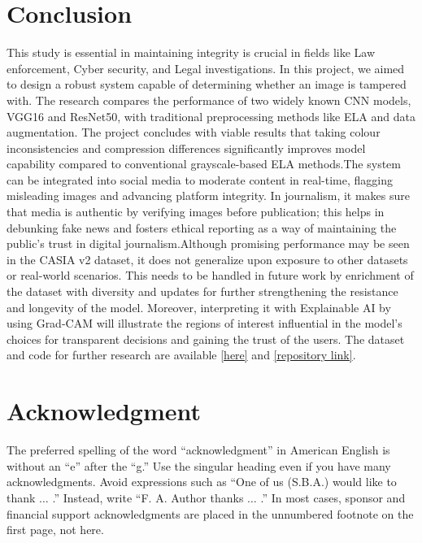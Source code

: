 \documentclass{ieeeaccess}
\begin{document}
\section{Conclusion}
This study is essential in maintaining integrity is crucial in fields like Law enforcement, Cyber security, and Legal investigations. In this project, we aimed to design a robust system capable of determining whether an image is tampered with. The research compares the performance of two widely known CNN models, VGG16 and ResNet50, with traditional preprocessing methods like ELA and data augmentation. The project concludes with viable results that taking colour inconsistencies and compression differences significantly improves model capability compared to conventional grayscale-based ELA methods.The system can be integrated into social media to moderate content in real-time, flagging misleading images and advancing platform integrity. In journalism, it makes sure that media is authentic by verifying images before publication; this helps in debunking fake news and fosters ethical reporting as a way of maintaining the public's trust in digital journalism.Although promising performance may be seen in the CASIA v2 dataset, it does not generalize upon exposure to other datasets or real-world scenarios. This needs to be handled in future work by enrichment of the dataset with diversity and updates for further strengthening the resistance and longevity of the model. Moreover, interpreting it with Explainable AI by using Grad-CAM will illustrate the regions of interest influential in the model's choices for transparent decisions and gaining the trust of the users.
The dataset and code for further research are available \href{https://www.kaggle.com/datasets/divg07/casia-20-image-tampering-detection-dataset/data}{[here]} and \href{https://github.com/ayaz168/veriforge}{[repository link]}.




\section*{Acknowledgment}
The preferred spelling of the word ``acknowledgment'' in American English is
without an ``e'' after the ``g.'' Use the singular heading even if you have
many acknowledgments. Avoid expressions such as ``One of us (S.B.A.) would
like to thank $\ldots$ .'' Instead, write ``F. A. Author thanks $\ldots$ .'' In most
cases, sponsor and financial support acknowledgments are placed in the
unnumbered footnote on the first page, not here.
\end{document}
